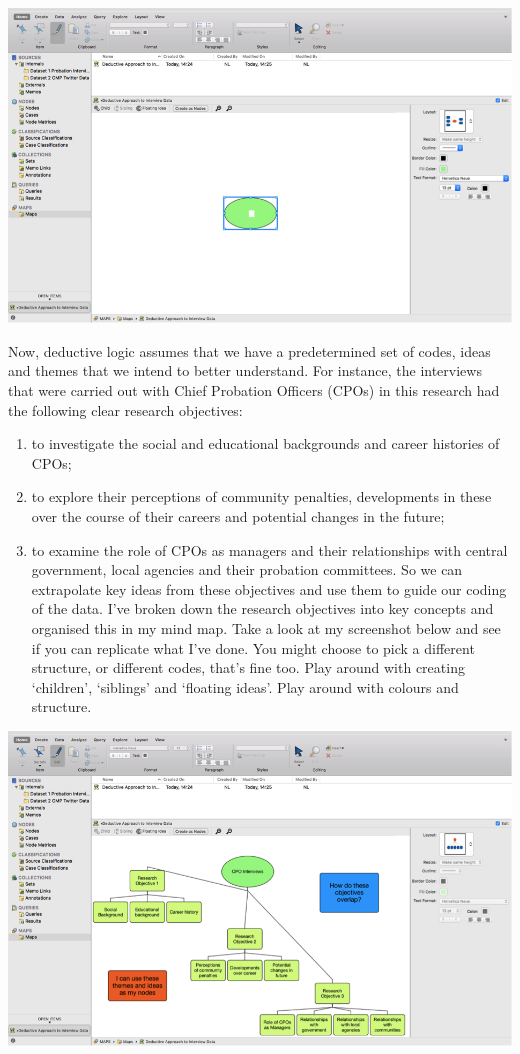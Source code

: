 \documentclass[]{book}
\providecommand{\tightlist}{%
  \setlength{\itemsep}{0pt}\setlength{\parskip}{0pt}}
\theoremstyle{definition}
\theoremstyle{definition}
\theoremstyle{definition}
\theoremstyle{remark}
\begin{document}
\includegraphics{imgs/qual_39.png}

Now, deductive logic assumes that we have a predetermined set of codes,
ideas and themes that we intend to better understand. For instance, the
interviews that were carried out with Chief Probation Officers (CPOs) in
this research had the following clear research objectives:

\begin{enumerate}
\def\labelenumi{\arabic{enumi}.}
\tightlist
\item
  to investigate the social and educational backgrounds and career
  histories of CPOs;
\item
  to explore their perceptions of community penalties, developments in
  these over the course of their careers and potential changes in the
  future;
\item
  to examine the role of CPOs as managers and their relationships with
  central government, local agencies and their probation committees. So
  we can extrapolate key ideas from these objectives and use them to
  guide our coding of the data. I've broken down the research objectives
  into key concepts and organised this in my mind map. Take a look at my
  screenshot below and see if you can replicate what I've done. You
  might choose to pick a different structure, or different codes, that's
  fine too. Play around with creating `children', `siblings' and
  `floating ideas'. Play around with colours and structure.
\end{enumerate}

\includegraphics{imgs/qual_40.png}
\end{document}
